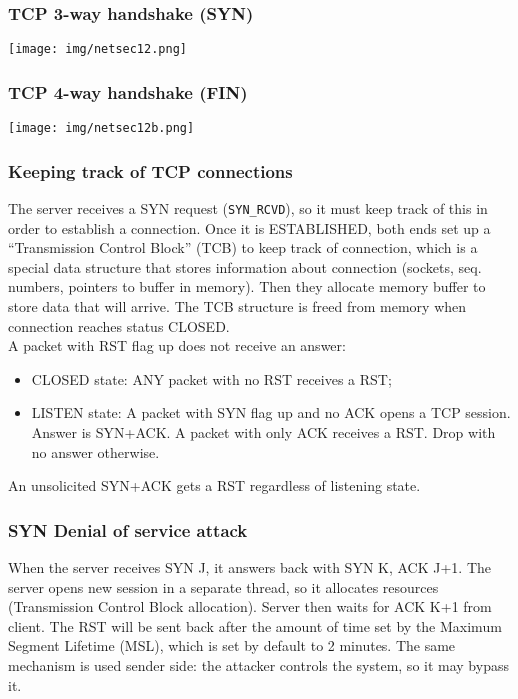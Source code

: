 \documentclass[a4paper, 10pt, titlepage]{article}
\begin{document}
\subsubsection*{TCP 3-way handshake (SYN)}
\begin{center}
	\texttt{[image: img/netsec12.png]}
\end{center}

\subsubsection*{TCP 4-way handshake (FIN)}
\begin{center}
	\texttt{[image: img/netsec12b.png]}
\end{center}

\subsubsection*{Keeping track of TCP connections}
The server receives a SYN request (\lstinline|SYN_RCVD|), so it must keep track of this in order to establish a connection. Once it is ESTABLISHED, both ends set up a “Transmission Control Block” (TCB) to keep track of connection, which is a special data structure that stores information about connection (sockets, seq. numbers, pointers to buffer in memory). Then they allocate memory buffer to store data that will arrive. The TCB structure is freed from memory when connection reaches status CLOSED.\medskip \\
A packet with RST flag up does not receive an answer:
\begin{itemize}
\item CLOSED state: ANY packet with no RST receives a RST;
\item LISTEN state: A packet with SYN flag up and no ACK opens a TCP
session. Answer is SYN+ACK. A packet with only ACK receives a RST. Drop with no answer otherwise.
\end{itemize}
An unsolicited SYN+ACK gets a RST regardless of listening state.

\subsubsection{SYN Denial of service attack}
When the server receives SYN J, it answers back with SYN K, ACK J+1. The server opens new session in a separate thread, so it allocates resources (Transmission Control Block allocation). Server then waits for ACK K+1 from client. The RST will be sent back after the amount of time set by the Maximum Segment Lifetime (MSL), which is set by default to 2 minutes. The same mechanism is used sender side: the attacker controls the system, so it may bypass it.
\end{document}
